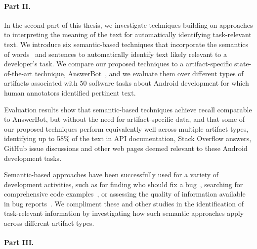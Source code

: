 \paragraph{\textbf{Part II.}} 


In the second part of this thesis, we investigate
techniques building on approaches to interpreting the meaning of the text 
for automatically identifying task-relevant text.
We introduce six semantic-based techniques that incorporate the semantics of words~\cite{Mikolov2013} and sentences to automatically identify text likely relevant to a developer's task.
We compare our proposed techniques to a artifact-specific state-of-the-art technique, AnswerBot~\cite{Xu2017},
and we evaluate them over different types of artifacts
associated with 50 software tasks about Android development
for which human annotators identified pertinent text.


Evaluation results show that semantic-based techniques
achieve recall comparable to AnswerBot, but without the need for artifact-specific data,
and that some of our proposed techniques perform equivalently well across
multiple artifact types, identifying up to 58\%
of the text 
in API documentation, Stack Overflow answers,
GitHub issue discussions and other web pages
deemed relevant to these Android development tasks.


Semantic-based approaches have been successfully used for a variety of development activities, such as
for finding who should fix a bug~\cite{yang2016}, searching for comprehensive code examples~\cite{silva2019},
or assessing the quality of information available in bug reports~\cite{chaparro2019}.
We compliment these and other studies in the identification of task-relevant information
by investigating how such semantic approaches apply across different artifact types.




\paragraph{\textbf{Part III.}} 











